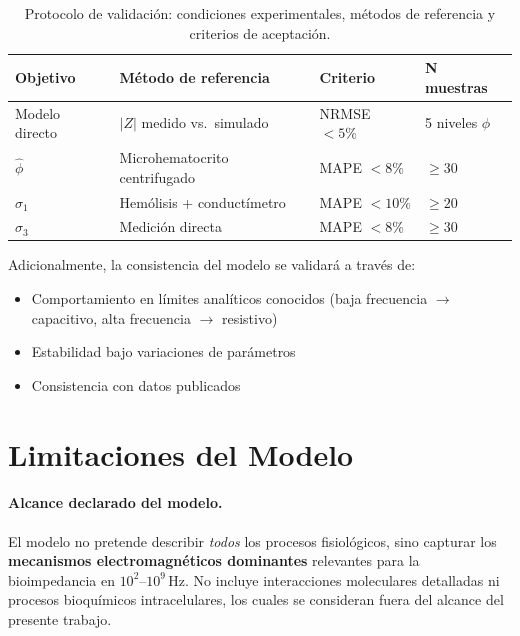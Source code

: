 \documentclass[12pt]{article}
\begin{document}
\begin{table}[H]
\centering
\caption{Protocolo de validaci\'on: condiciones experimentales, m\'etodos de referencia
y criterios de aceptaci\'on.}
\label{tab:validacion}
\begin{tabular}{@{}llll@{}}
\toprule
\textbf{Objetivo} & \textbf{M\'etodo de referencia} & \textbf{Criterio}
& \textbf{N muestras} \\
\midrule
Modelo directo & $|Z|$ medido vs.\ simulado & NRMSE $< 5\%$ & 5 niveles $\phi$ \\
$\hat{\phi}$ & Microhematocrito centrifugado & MAPE $< 8\%$ & $\geq 30$ \\
$\hat{\sigma}_1$ & Hem\'olisis + conduct\'imetro & MAPE $< 10\%$ & $\geq 20$ \\
$\hat{\sigma}_3$ & Medici\'on directa & MAPE $< 8\%$ & $\geq 30$ \\
\bottomrule

\end{tabular}
\end{table}

Adicionalmente, la consistencia del modelo se validar\'a a trav\'es de:

\begin{itemize}
\item Comportamiento en l\'imites anal\'iticos conocidos (baja frecuencia $\to$ capacitivo,
alta frecuencia $\to$ resistivo)
\item Estabilidad bajo variaciones de par\'ametros
\item Consistencia con datos publicados \citep{Schwan1957, Asami2002, Buendia2015}
\end{itemize}


\section{Limitaciones del Modelo}


\label{sec:limitations}

\paragraph{Alcance declarado del modelo.}
El modelo no pretende describir \emph{todos} los procesos
fisiol\'ogicos, sino capturar los \textbf{mecanismos
electromagn\'eticos dominantes} relevantes para la
bioimpedancia en $10^2$--$10^9$\,Hz.
No incluye interacciones moleculares detalladas ni
procesos bioqu\'imicos intracelulares, los cuales se
consideran fuera del alcance del presente trabajo.
\end{document}
